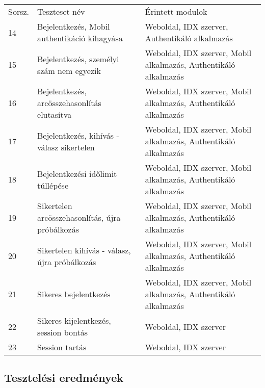 \begin{tabular}{|p{1cm}|p{8cm} |p{4cm}|}
  \hline
\rowcolor{Title}
\multicolumn{3}{ |c| }{\color{white} Teszteset leírása} \\
  \hline
\rowcolor{Header}
Sorsz. & Teszteset név & Érintett modulok\tabularnewline
\hline 
 
 14  & Bejelentkezés, Mobil authentikáció kihagyása & Weboldal, IDX szerver, Authentikáló alkalmazás \tabularnewline
  \hline
 15  & Bejelentkezés, személyi szám nem egyezik  & Weboldal, IDX szerver, Mobil alkalmazás, Authentikáló alkalmazás \tabularnewline
  \hline
 16  & Bejelentkezés, arcösszehasonlítás elutasítva  & Weboldal, IDX szerver, Mobil alkalmazás, Authentikáló alkalmazás \tabularnewline
  \hline
 17  & Bejelentkezés, kihívás - válasz sikertelen  & Weboldal, IDX szerver, Mobil alkalmazás, Authentikáló alkalmazás \tabularnewline
  \hline
 18  & Bejelentkezési időlimit túllépése  & Weboldal, IDX szerver, Mobil alkalmazás, Authentikáló alkalmazás \tabularnewline
  \hline
 19  & Sikertelen arcösszehasonlítás, újra próbálkozás  & Weboldal, IDX szerver, Mobil alkalmazás, Authentikáló alkalmazás \tabularnewline
  \hline
 20  & Sikertelen kihívás - válasz, újra próbálkozás  & Weboldal, IDX szerver, Mobil alkalmazás, Authentikáló alkalmazás \tabularnewline
  \hline
 21  &Sikeres bejelentkezés  & Weboldal, IDX szerver, Mobil alkalmazás, Authentikáló alkalmazás \tabularnewline
  \hline
 22  &Sikeres kijelentkezés, session bontás  & Weboldal, IDX szerver \tabularnewline
  \hline
 23  & Session tartás  & Weboldal, IDX szerver \tabularnewline
  \hline
\end{tabular}

\subsection{Tesztelési eredmények}
